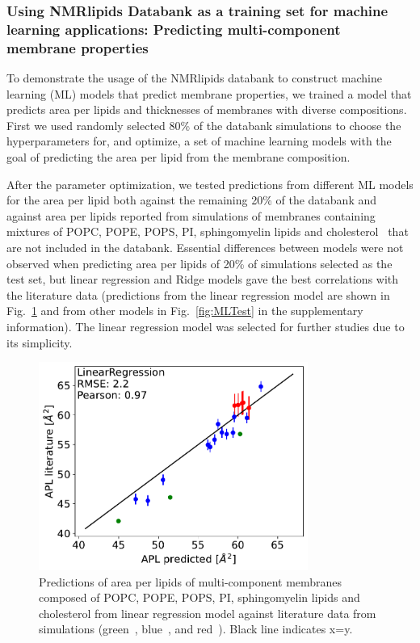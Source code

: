 \documentclass[fleqn,10pt]{wlscirep}
\begin{document}
\subsubsection{Using NMRlipids Databank as a training set for machine learning applications: Predicting multi-component membrane properties}

To demonstrate the usage of the NMRlipids databank to construct machine learning (ML) models that predict membrane properties, we trained a model that predicts area per lipids and thicknesses of membranes with diverse compositions. First we used randomly selected 80\% of the databank simulations to choose the hyperparameters for, and optimize, a set of machine learning models with the goal of predicting the area per lipid from the membrane composition.


 After the parameter optimization, we tested predictions from different ML models for the area per lipid both against the remaining 20\% of the databank and against area per lipids reported from simulations of membranes containing mixtures of POPC, POPE, POPS, PI, sphingomyelin lipids and cholesterol~\cite{shahane19,kumar21,oliveira22} that are not included in the databank. Essential differences between models were not observed when predicting area per lipids of 20\% of simulations selected as the test set, but linear regression and Ridge models gave the best correlations with the literature data (predictions  from the linear regression model are shown in Fig.~\ref{fig:LinearRegressionTest} and from other models in Fig.~\ref{fig:MLTest} in the supplementary information). The linear regression model was selected for further studies due to its simplicity.
\begin{figure}
    \centering
    \includegraphics[width=88mm]{Figures/MLtest/LinearRegressiontest.pdf}
    \caption{Predictions of area per lipids of multi-component membranes composed of POPC, POPE, POPS, PI, sphingomyelin lipids and cholesterol from linear regression model against literature data from simulations (green~\cite{shahane19}, blue~\cite{kumar21}, and red~\cite{oliveira22}). Black line indicates x=y.}
    \label{fig:LinearRegressionTest}
\end{figure}
\end{document}

